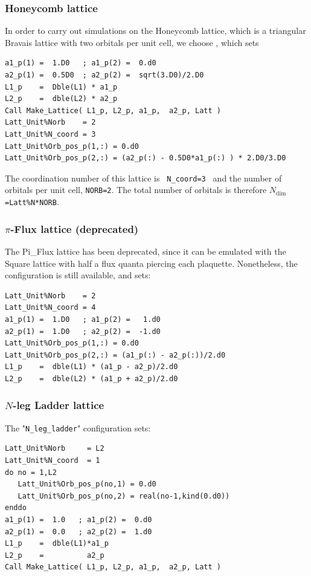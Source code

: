 \subsubsection{Honeycomb lattice}

In order to carry out simulations on the Honeycomb lattice, which is a triangular Bravais lattice with two orbitals per unit cell, we choose   , which sets
\begin{lstlisting}[style=fortran]
a1_p(1) =  1.D0   ; a1_p(2) =  0.d0
a2_p(1) =  0.5D0  ; a2_p(2) =  sqrt(3.D0)/2.D0
L1_p    =  Dble(L1) * a1_p
L2_p    =  dble(L2) * a2_p
Call Make_Lattice( L1_p, L2_p, a1_p,  a2_p, Latt )
Latt_Unit%Norb    = 2
Latt_Unit%N_coord = 3
Latt_Unit%Orb_pos_p(1,:) = 0.d0 
Latt_Unit%Orb_pos_p(2,:) = (a2_p(:) - 0.5D0*a1_p(:) ) * 2.D0/3.D0
\end{lstlisting}
The coordination number of this lattice is \texttt{ N\_coord=3 }  and  the number of orbitals per unit cell, \texttt{NORB=2}. The total number of orbitals is therefore \texttt{$N_{\mathrm{dim}}$=Latt\%N*NORB}.


\subsubsection{$\pi$-Flux lattice (deprecated)}

The Pi\_Flux lattice has been deprecated, since it can be emulated with the Square lattice with half a flux quanta piercing each plaquette. Nonetheless, the configuration is still available, and sets:
\begin{lstlisting}[style=fortran]
Latt_Unit%Norb    = 2
Latt_Unit%N_coord = 4
a1_p(1) =  1.D0   ; a1_p(2) =   1.d0
a2_p(1) =  1.D0   ; a2_p(2) =  -1.d0
Latt_Unit%Orb_pos_p(1,:) = 0.d0 
Latt_Unit%Orb_pos_p(2,:) = (a1_p(:) - a2_p(:))/2.d0 
L1_p    =  dble(L1) * (a1_p - a2_p)/2.d0
L2_p    =  dble(L2) * (a1_p + a2_p)/2.d0
\end{lstlisting}


\subsubsection{$N$-leg Ladder lattice}
The "\texttt{N\_leg\_ladder}"   configuration sets:
\begin{lstlisting}[style=fortran]
Latt_Unit%Norb     = L2
Latt_Unit%N_coord  = 1
do no = 1,L2
   Latt_Unit%Orb_pos_p(no,1) = 0.d0 
   Latt_Unit%Orb_pos_p(no,2) = real(no-1,kind(0.d0))
enddo
a1_p(1) =  1.0   ; a1_p(2) =  0.d0
a2_p(1) =  0.0   ; a2_p(2) =  1.d0
L1_p    =  dble(L1)*a1_p
L2_p    =          a2_p
Call Make_Lattice( L1_p, L2_p, a1_p,  a2_p, Latt )
\end{lstlisting}


